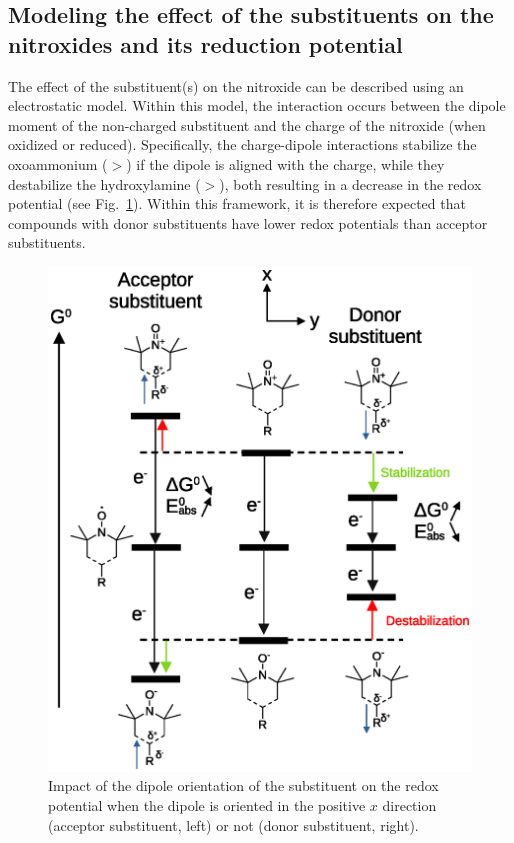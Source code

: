 \documentclass[review,preprint]{elsarticle}
\begin{document}
\subsection{Modeling the effect of the substituents on the nitroxides and its reduction potential}\label{sec:eleczhang}

The effect of the substituent(s) on the nitroxide can be described using an electrostatic model. Within this model, the interaction occurs between the dipole moment of the non-charged substituent and the charge of the nitroxide (when oxidized or reduced).  Specifically, the charge-dipole interactions stabilize the oxoammonium ($>$) if the dipole is aligned with the charge, while they destabilize the hydroxylamine ($>$), both resulting in a decrease in the redox potential (see Fig.~\ref{fig:dipole}). Within this framework, it is therefore expected that compounds with donor substituents have lower redox potentials than acceptor substituents.


\begin{figure}[!h]
	\centering
	\includegraphics[width=.8\linewidth]{Figure4}
	\caption{Impact of the dipole orientation of the  substituent on the redox potential when the dipole is oriented in  the positive $x$ direction (acceptor substituent, left) or not (donor substituent, right).}
	\label{fig:dipole}
\end{figure}
\end{document}
